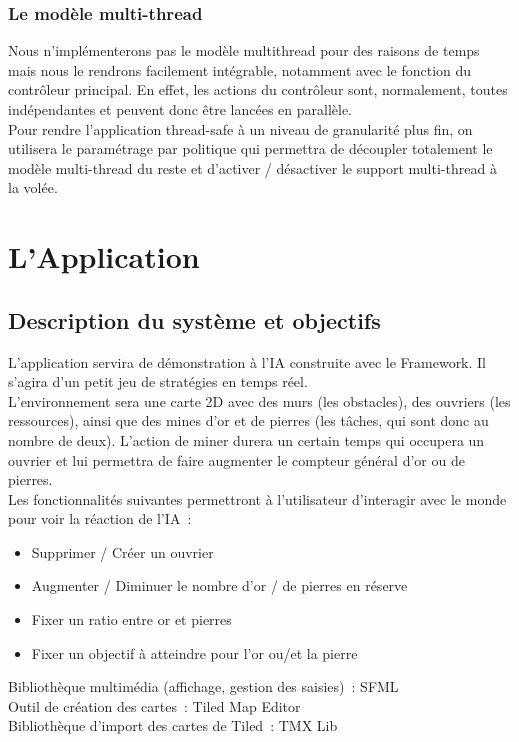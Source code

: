 \subsubsection*{Le modèle multi-thread}
Nous n'implémenterons pas le modèle multithread pour des raisons de temps mais nous le rendrons facilement intégrable, notamment avec le fonction du contrôleur principal. En effet, les actions du contrôleur sont, normalement, toutes indépendantes et peuvent donc être lancées en parallèle.\\

Pour rendre l'application thread-safe à un niveau de granularité plus fin, on utilisera le paramétrage par politique qui permettra de découpler totalement le modèle multi-thread du reste et d'activer / désactiver le support multi-thread à la volée.

\section{L’Application}

\subsection{Description du système et objectifs}

L'application servira de démonstration à l'IA construite avec le Framework. Il s'agira d'un petit jeu de stratégies en temps réel.\\
L'environnement sera une carte 2D avec des murs (les obstacles), des ouvriers (les ressources), ainsi que des mines d'or et de pierres (les tâches, qui sont donc au nombre de deux). L'action de miner durera un certain temps qui occupera un ouvrier et lui permettra de faire augmenter le compteur général d'or ou de pierres.\\

Les fonctionnalités suivantes permettront à l'utilisateur d'interagir avec le monde pour voir la réaction de l'IA~:
\begin{itemize}
\item Supprimer / Créer un ouvrier
\item Augmenter / Diminuer le nombre d'or / de pierres en réserve
\item Fixer un ratio entre or et pierres
\item Fixer un objectif à atteindre pour l'or ou/et la pierre
\end{itemize} \vspace{4mm}

\noindent Bibliothèque multimédia (affichage, gestion des saisies)~: SFML\\
Outil de création des cartes~: Tiled Map Editor\\
Bibliothèque d'import des cartes de Tiled~: TMX Lib

